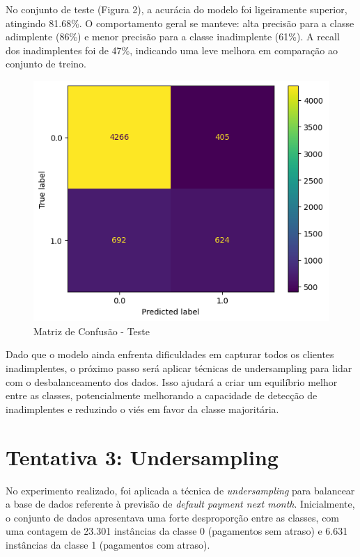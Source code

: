 \documentclass{abntpuc}
\begin{document}
No conjunto de teste (Figura 2), a acurácia do modelo foi ligeiramente superior, atingindo 81.68\%. O comportamento geral se manteve: alta precisão para a classe adimplente (86\%) e menor precisão para a classe inadimplente (61\%). A recall dos inadimplentes foi de 47\%, indicando uma leve melhora em comparação ao conjunto de treino.

\begin{figure}[H]
    \centering
    \includegraphics[width=\textwidth]{grafico8.png}
    \caption{Matriz de Confusão - Teste}
\end{figure}

Dado que o modelo ainda enfrenta dificuldades em capturar todos os clientes inadimplentes, o próximo passo será aplicar técnicas de undersampling para lidar com o desbalanceamento dos dados. Isso ajudará a criar um equilíbrio melhor entre as classes, potencialmente melhorando a capacidade de detecção de inadimplentes e reduzindo o viés em favor da classe majoritária.

\section{Tentativa 3: Undersampling}

No experimento realizado, foi aplicada a técnica de \textit{undersampling} para balancear a base de dados referente à previsão de \textit{default payment next month}. Inicialmente, o conjunto de dados apresentava uma forte desproporção entre as classes, com uma contagem de 23.301 instâncias da classe 0 (pagamentos sem atraso) e 6.631 instâncias da classe 1 (pagamentos com atraso).
\end{document}
